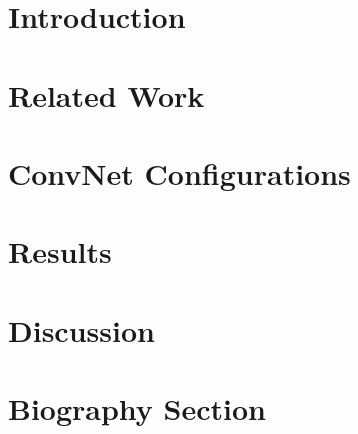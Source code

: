 \documentclass[lettersize,journal]{IEEEtran}
\begin{document}
\section{Introduction}

\label{chap:1}

\section{Related Work}
\label{chap:2}



\section{ConvNet Configurations}
\label{chap:3}




\section{Results}
\label{chap:4}




%


%

\section{Discussion}








\section{Biography Section}
 
\end{document}
